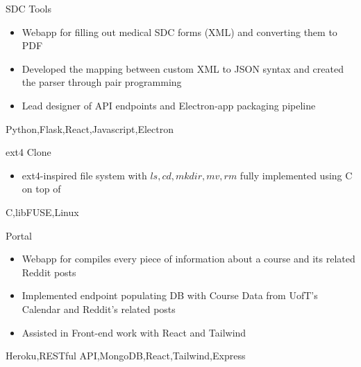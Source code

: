 %
%
%


\begin{projects}
	\project
	{SDC Tools}{}
	{}
	{\begin{itemize}
        \item{Webapp for filling out medical SDC forms (XML) and converting them to PDF}
        \item{Developed the mapping between custom XML to JSON syntax and created the parser through pair programming}
        \item{Lead designer of API endpoints and Electron-app packaging pipeline}
      \end{itemize}
    }
	{Python,Flask,React,Javascript,Electron}

    \project
	{ext4 Clone}{}
	{}
	{\begin{itemize}
        \item{ext4-inspired file system with $ls,cd,mkdir,mv,rm$ fully implemented using C on top of }
      \end{itemize}   
    }
	{C,libFUSE,Linux}
				
	\project
	{Portal}{}
	{ }
	{\begin{itemize}
        \item{Webapp for compiles every piece of information about a course and its related Reddit posts}
        \item{Implemented endpoint populating DB with Course Data from UofT's Calendar and Reddit's related posts}
        \item{Assisted in Front-end work with React and Tailwind}
      \end{itemize}
    }
	{Heroku,RESTful API,MongoDB,React,Tailwind,Express}

\end{projects}
